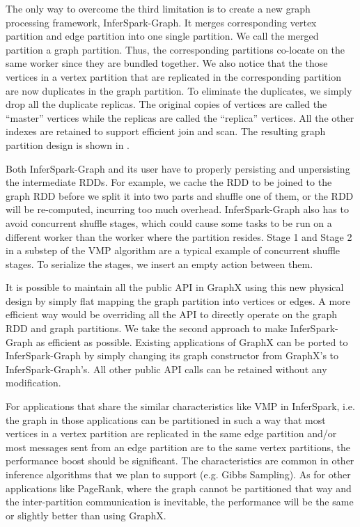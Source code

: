 The only way to overcome the third limitation is to create a new graph processing
framework, InferSpark-Graph. It merges corresponding vertex partition and
edge partition into one single partition. We call the merged partition a graph
partition. Thus, the corresponding partitions co-locate on the same worker
since they are bundled together. We also notice that the those vertices in a
vertex partition that are replicated in the corresponding partition are now
duplicates in the graph partition. To eliminate the duplicates, we simply drop
all the duplicate replicas. The
original copies of vertices are called the ``master'' vertices while the
replicas are called the ``replica'' vertices. All the other indexes are
retained to support efficient join and scan. The resulting graph partition
design is shown in .

Both InferSpark-Graph and its user have to properly persisting and
unpersisting the intermediate RDDs. For example, we cache the RDD to be joined
to the graph RDD before we split it into two parts and shuffle one of them, or
the RDD will be re-computed, incurring too much overhead. InferSpark-Graph
also has to avoid concurrent shuffle stages, which could cause some tasks to
be run on a different worker than the worker where the partition resides.
Stage 1 and Stage 2 in a substep of the VMP algorithm are a
typical example of concurrent shuffle stages. To serialize the stages, we
insert an empty action between them.

It is possible to maintain all the public API in GraphX using this new
physical design by simply flat mapping the graph partition into vertices or
edges. A more efficient way would be overriding all the API to directly
operate on the graph RDD and graph partitions. We take the second approach to
make InferSpark-Graph as efficient as possible. Existing applications of
GraphX can be ported to InferSpark-Graph by simply changing its graph
constructor from GraphX's to InferSpark-Graph's. All other public API calls
can be retained without any modification. 

For applications that share the similar characteristics like VMP in
InferSpark, i.e. the graph in those applications can be partitioned in such a
way that most vertices in a vertex partition are replicated in the same
edge partition and/or most messages sent from an edge partition are to the
same vertex partitions, the performance boost should be significant. The
characteristics are common in other inference algorithms that
we plan to support (e.g. Gibbs Sampling). As for other applications like
PageRank, where the graph cannot be partitioned that way and the
inter-partition communication is inevitable, the performance will be the same
or slightly better than using GraphX.

